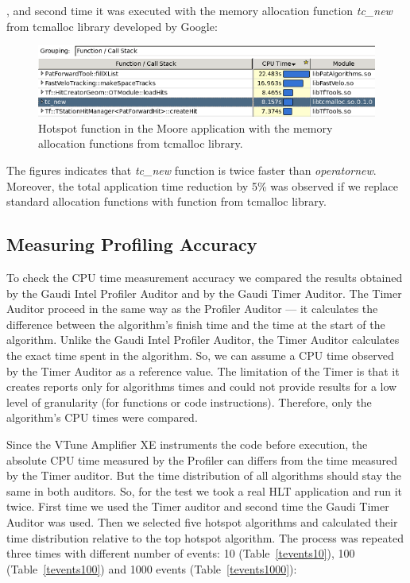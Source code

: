 \documentclass[a4paper]{jpconf}
\begin{document}
, and second time it was executed with the memory allocation function {\it tc\_new} from tcmalloc library developed by Google:

\begin{figure}[H]
\begin{minipage}{\textwidth}
\includegraphics[width=\textwidth]{figs/fig11.png}
\caption{\label{fig11}Hotspot function in the Moore application with the memory allocation functions from tcmalloc library.}
\end{minipage}
\end{figure}

The figures indicates that {\it tc\_new} function is twice faster than {\it operatornew}. Moreover, the total application time reduction by 5\% was observed if we replace standard allocation functions with function from tcmalloc library.

\subsection{Measuring Profiling Accuracy}

To check the CPU time measurement accuracy we compared the results obtained by the Gaudi Intel Profiler Auditor and by the Gaudi Timer Auditor. The Timer Auditor proceed  in the same way as the Profiler Auditor ---  it calculates the difference between the algorithm’s finish time and the time at the start of the algorithm. Unlike the Gaudi Intel Profiler Auditor, the Timer Auditor calculates the exact time spent in the algorithm. So, we can assume a CPU time observed by the Timer Auditor as a reference value. The limitation of the Timer is that it creates reports only for algorithms times  and could not provide results for a low level of granularity (for functions or code instructions). Therefore, only the algorithm’s CPU times were compared.

Since the VTune Amplifier XE instruments the code before execution, the absolute CPU time measured by the Profiler can differs from the time measured by the Timer auditor.  But the time distribution of all algorithms should stay the same in both auditors.  So, for the test we took a real HLT application and run it twice. First time we used  the Timer auditor  and second time the Gaudi Timer Auditor was used. Then we selected five hotspot algorithms and calculated their time distribution relative to the top hotspot algorithm. The process was repeated three times with different number of events: 10 (Table~\ref{tevents10}), 100 (Table~\ref{tevents100}) and 1000 events (Table~\ref{tevents1000}): 
\end{document}
